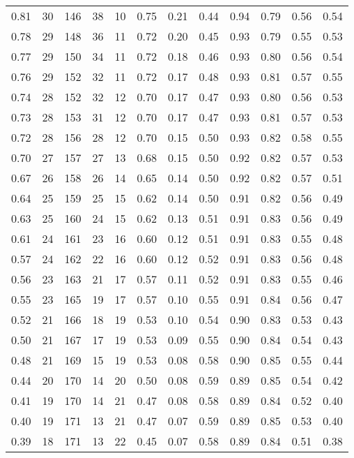 \begin{table}[ht]
\begin{tabular}{r|rrrrrrrrrrr}
  0.81 & 30 & 146 & 38 & 10 & 0.75 & 0.21 & 0.44 & 0.94 & 0.79 & 0.56 & 0.54 \\ 
  0.78 & 29 & 148 & 36 & 11 & 0.72 & 0.20 & 0.45 & 0.93 & 0.79 & 0.55 & 0.53 \\ 
  0.77 & 29 & 150 & 34 & 11 & 0.72 & 0.18 & 0.46 & 0.93 & 0.80 & 0.56 & 0.54 \\ 
  0.76 & 29 & 152 & 32 & 11 & 0.72 & 0.17 & 0.48 & 0.93 & 0.81 & 0.57 & 0.55 \\ 
  0.74 & 28 & 152 & 32 & 12 & 0.70 & 0.17 & 0.47 & 0.93 & 0.80 & 0.56 & 0.53 \\ 
  0.73 & 28 & 153 & 31 & 12 & 0.70 & 0.17 & 0.47 & 0.93 & 0.81 & 0.57 & 0.53 \\ 
  0.72 & 28 & 156 & 28 & 12 & 0.70 & 0.15 & 0.50 & 0.93 & 0.82 & 0.58 & 0.55 \\ 
  0.70 & 27 & 157 & 27 & 13 & 0.68 & 0.15 & 0.50 & 0.92 & 0.82 & 0.57 & 0.53 \\ 
  0.67 & 26 & 158 & 26 & 14 & 0.65 & 0.14 & 0.50 & 0.92 & 0.82 & 0.57 & 0.51 \\ 
  0.64 & 25 & 159 & 25 & 15 & 0.62 & 0.14 & 0.50 & 0.91 & 0.82 & 0.56 & 0.49 \\ 
  0.63 & 25 & 160 & 24 & 15 & 0.62 & 0.13 & 0.51 & 0.91 & 0.83 & 0.56 & 0.49 \\ 
  0.61 & 24 & 161 & 23 & 16 & 0.60 & 0.12 & 0.51 & 0.91 & 0.83 & 0.55 & 0.48 \\ 
  0.57 & 24 & 162 & 22 & 16 & 0.60 & 0.12 & 0.52 & 0.91 & 0.83 & 0.56 & 0.48 \\ 
  0.56 & 23 & 163 & 21 & 17 & 0.57 & 0.11 & 0.52 & 0.91 & 0.83 & 0.55 & 0.46 \\ 
  0.55 & 23 & 165 & 19 & 17 & 0.57 & 0.10 & 0.55 & 0.91 & 0.84 & 0.56 & 0.47 \\ 
  0.52 & 21 & 166 & 18 & 19 & 0.53 & 0.10 & 0.54 & 0.90 & 0.83 & 0.53 & 0.43 \\ 
  0.50 & 21 & 167 & 17 & 19 & 0.53 & 0.09 & 0.55 & 0.90 & 0.84 & 0.54 & 0.43 \\ 
  0.48 & 21 & 169 & 15 & 19 & 0.53 & 0.08 & 0.58 & 0.90 & 0.85 & 0.55 & 0.44 \\ 
  0.44 & 20 & 170 & 14 & 20 & 0.50 & 0.08 & 0.59 & 0.89 & 0.85 & 0.54 & 0.42 \\ 
  0.41 & 19 & 170 & 14 & 21 & 0.47 & 0.08 & 0.58 & 0.89 & 0.84 & 0.52 & 0.40 \\ 
  0.40 & 19 & 171 & 13 & 21 & 0.47 & 0.07 & 0.59 & 0.89 & 0.85 & 0.53 & 0.40 \\ 
  0.39 & 18 & 171 & 13 & 22 & 0.45 & 0.07 & 0.58 & 0.89 & 0.84 & 0.51 & 0.38 \\ 

\end{tabular}
\end{table}
